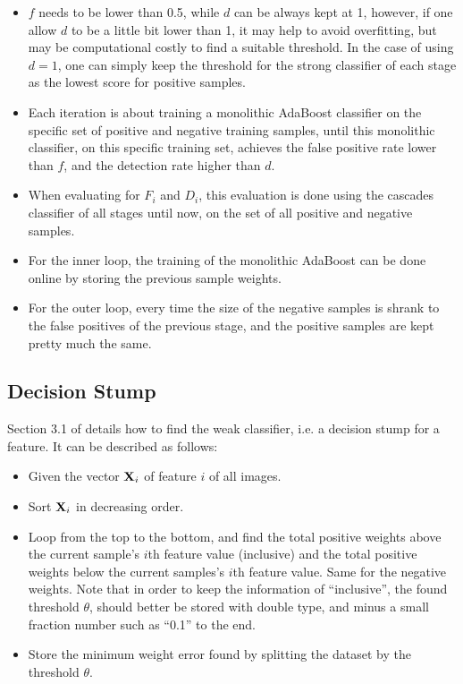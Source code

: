 \documentclass[12pt]{article}
\begin{document}
\begin{itemize}
\item $f$ needs to be lower than 0.5, while $d$ can be always kept at 1, however, if one allow $d$ to be a little bit lower than 1, it may help to avoid overfitting, but may be computational costly to find a suitable threshold. In the case of using $d=1$, one can simply keep the threshold for the strong classifier of each stage as the lowest score for positive samples.
\item Each iteration is about training a monolithic AdaBoost classifier on the specific set of positive and negative training samples, until this monolithic classifier, on this specific training set, achieves the false positive rate lower than $f$, and the detection rate higher than $d$.
\item When evaluating for $F_i$ and $D_i$, this evaluation is done using the cascades classifier of all stages until now, on the set of all positive and negative samples.
\item For the inner loop, the training of the monolithic AdaBoost can be done online by storing the previous sample weights.
\item For the outer loop, every time the size of the negative samples is shrank to the false positives of the previous stage, and the positive samples are kept pretty much the same.
\end{itemize}

\subsection{Decision Stump}
Section 3.1 of \cite{Viola2004} details how to find the weak classifier, i.e. a decision stump for a feature.
It can be described as follows:\\
\begin{itemize}
\item Given the vector ${\bf X}_i$ of feature $i$ of all images.
\item Sort ${\bf X}_i$ in decreasing order.
\item Loop from the top to the bottom, and find the total positive weights above the current sample's $i$th feature value (inclusive) and the total positive weights below the current samples's $i$th feature value. Same for the negative weights. Note that in order to keep the information of ``inclusive'', the found threshold $\theta$, should better be stored with double type, and minus a small fraction number such as ``0.1'' to the end.
\item Store the minimum weight error found by splitting the dataset by the threshold $\theta$.
\end{itemize}
\end{document}
